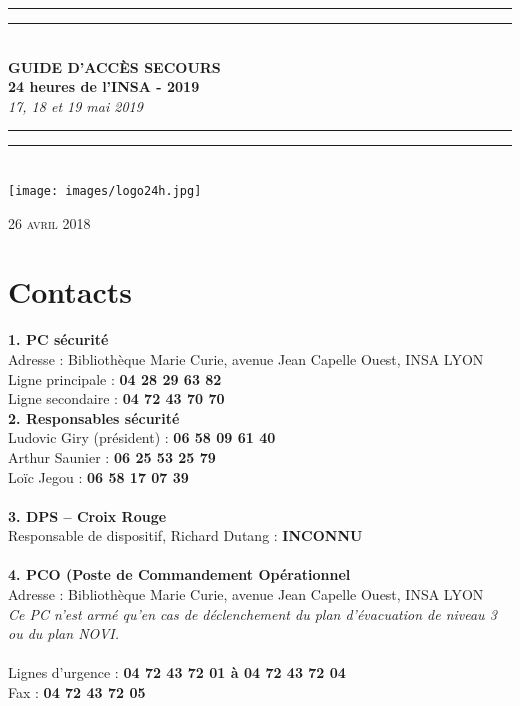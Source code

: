 \documentclass[hidelinks, paper=a4, fontsize=13pt]{report}
\begin{document}
\begin{center}
	\rule[0.5ex]{\linewidth}{2pt}\vspace*{-\baselineskip}\vspace*{3.2pt}
	\rule[0.5ex]{\linewidth}{1pt}\\[\baselineskip]
	\huge \textbf{GUIDE D'ACCÈS SECOURS\\24 heures de l'INSA - 2019} \\[4mm]
	{\Large \textit{17, 18 et 19 mai 2019}}\\
	\rule[0.5ex]{\linewidth}{1pt}\vspace*{-\baselineskip}\vspace{3.2pt}
	\rule[0.5ex]{\linewidth}{2pt}\\
	\vspace{30mm}
	\texttt{[image: images/logo24h.jpg]}\\
	
	\vspace{50mm}

\end{center}
	\begin{flushright}
		{\large\textsc{26 avril 2018}}
\end{flushright}

\chapter*{Contacts}

\textbf{1. PC sécurité}\\
Adresse : Bibliothèque Marie Curie, avenue Jean Capelle Ouest, INSA LYON\\
Ligne principale : \textbf{04 28 29 63 82}\\
Ligne secondaire : \textbf{04 72 43 70 70}\\

\textbf{2. Responsables sécurité}\\
Ludovic Giry (président) : \textbf{06 58 09 61 40}\\
Arthur Saunier : \textbf{06 25 53 25 79}\\
Loïc Jegou : \textbf{06 58 17 07 39}\\
\\

\textbf{3. DPS – Croix Rouge}\\
Responsable de dispositif, Richard Dutang : \textbf{INCONNU}\\\\

\textbf{4. PCO (Poste de Commandement Opérationnel}\\
Adresse : Bibliothèque Marie Curie, avenue Jean Capelle Ouest, INSA LYON\\
\textit{Ce PC n’est armé qu'en cas de déclenchement du plan d'évacuation de niveau 3 ou du plan NOVI.\\\\
}Lignes d’urgence : 			\textbf{04 72 43 72 01   à 	04 72 43 72 04}\\
Fax : 					\textbf{04 72 43 72 05}\\
\end{document}
